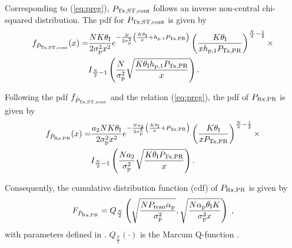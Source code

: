 Corresponding to (\ref{eq:preg}), $P_{\text{Tx,ST,cont}}$ follows an inverse non-central chi-squared distribution. The pdf for $P_{\text{Tx,ST,cont}}$  is given by
\begin{align}
f_{\hat{P}_{\text{Tx,ST,cont}}}(x) =& \frac{N K \theta_{\text{I}}}{2\sigma^2_{\text{p}} x^2} e^{- \frac{N}{2 \sigma^2_{\text{p}}}\left( \frac{K  \theta_{\text{I}}}{x} + h_{\text{p,1}} P_{\text{Tx,PR}} \right)} \left( \frac{K \theta_{\text{I}}}{x h_{\text{p,1}} P_{\text{Tx,PR}}}   \right)^{\frac{N}{4} - \frac{1}{2}} \label{eq:dpreg_pl} \times \\
\quad & I_{\frac{N}{2}  - 1}\left( \frac{N}{\sigma^2_{\text{p}}} \sqrt{\frac{ K \theta_{\text{I}} h_{\text{p,1}} P_{\text{Tx,PR}}}{x}}  \right). \nonumber
\end{align}

Following the pdf $f_{\hat{P}_{\text{Tx,ST,cont}}}$ and the relation (\ref{eq:preg}), the pdf of $P_{\text{Rx,PR}}$ is given by
\begin{align}
f_{\hat{P}_{\text{Rx,PR}}}(x) =& \frac{a_{\text{2}} N K \theta_{\text{I}}}{2\sigma^2_{\text{p}} x^2} e^{- \frac{N a_{\text{2}}}{2 \sigma^2_{\text{p}}}\left( \frac{K  \theta_{\text{I}}}{x} + P_{\text{Tx,PR}} \right)} \left( \frac{K \theta_{\text{I}}}{x P_{\text{Tx,PR}}}   \right)^{\frac{N}{4} - \frac{1}{2}} \times \label{eq:dpp_pl} \\
\quad & I_{\frac{N}{2}  - 1}\left( \frac{N a_{\text{2}}}{\sigma^2_{\text{p}}} \sqrt{\frac{ K \theta_{\text{I}} P_{\text{Tx,PR}}}{x}}  \right). \nonumber
\end{align}

Consequently, the cumulative distribution function (cdf) of $P_{\text{Rx,PR}}$ is given by %
\begin{equation}
	\label{kumu}
	F_{\hat{P}_{\text{Rx,PR}}} = Q_{\frac{N}{2}}\left(\sqrt{\frac{N P_\textrm{tran} \alpha_\textrm{p}}{\sigma_\textrm{p}^2}},\sqrt{\frac{N \alpha_\textrm{p} \theta_\textrm{I} K}{\sigma_\textrm{p}^2 x}}\right) \;  ,
\end{equation}
with parameters defined in \cite{Kaushik15}. $Q_{\frac{N}{2}}(\cdot)$ is the Marcum Q-function \cite{Jef00}.

